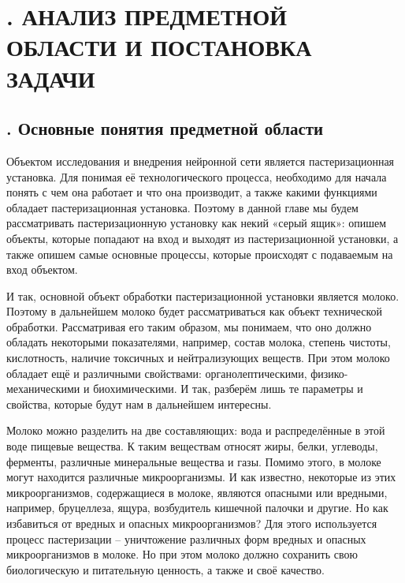 \setcounter{chaptercntr}{1}

\sectionbreak \section*{
  \gostTitleFont
  \redline
  \thechaptercntr .
  АНАЛИЗ ПРЕДМЕТНОЙ ОБЛАСТИ И ПОСТАНОВКА ЗАДАЧИ
}

\titlespace

\subsection*{ 
  \gostTitleFont
  \redline
  \thechaptercntr .\thesubchaptercntr \spc 
  Основные понятия предметной области
} \addtocounter{subchaptercntr}{1}

\subtitlespace

{\gostFont

  \par \redline Объектом исследования и внедрения нейронной сети является пастеризационная установка. Для понимая её технологического процесса, необходимо для начала понять с чем она работает и что она производит, а также какими функциями обладает пастеризационная установка. Поэтому в данной главе мы будем рассматривать пастеризационную установку как некий «серый ящик»: опишем объекты, которые попадают на вход и выходят из пастеризационной установки, а также опишем самые основные процессы, которые происходят с подаваемым на вход объектом.

  \par \redline И так, основной объект обработки пастеризационной установки является молоко. Поэтому в дальнейшем молоко будет рассматриваться как объект технической обработки. Рассматривая его таким образом, мы понимаем, что оно должно обладать некоторыми показателями, например, состав молока, степень чистоты, кислотность, наличие токсичных и нейтрализующих веществ. При этом молоко обладает ещё и различными свойствами: органолептическими, физико-механическими и биохимическими. И так, разберём лишь те параметры и свойства, которые будут нам в дальнейшем интересны.

  \par \redline Молоко можно разделить на две составляющих: вода и распределённые в этой воде пищевые вещества. К таким веществам относят жиры, белки, углеводы, ферменты, различные минеральные вещества и газы. Помимо этого, в молоке могут находится различные микроорганизмы. И как известно, некоторые из этих микроорганизмов, содержащиеся в молоке, являются опасными или вредными, например, бруцеллеза, ящура, возбудитель кишечной палочки и другие. Но как избавиться от вредных и опасных микроорганизмов?  Для этого используется процесс пастеризации {--} уничтожение различных форм вредных и опасных микроорганизмов в молоке. Но при этом молоко должно сохранить свою биологическую и питательную ценность, а также и своё качество.

}
